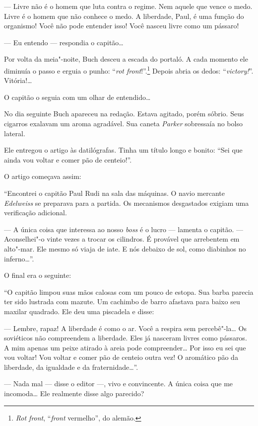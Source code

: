 --- Livre não é o homem que luta contra o regime. Nem aquele que vence o
medo. Livre é o homem que não conhece o medo. A liberdade, Paul, é uma
função do organismo! Você não pode entender isso! Você nasceu livre como
um pássaro!

--- Eu entendo --- respondia o capitão\ldots{}

Por volta da meia"-noite, Buch desceu a escada do portaló. A cada momento
ele diminuía o passo e erguia o punho: ``\emph{rot front}!''.\footnote{\emph{Rot
  front}, ``\emph{front} vermelho'', do alemão.} Depois abria os
dedos: ``\emph{victory!}''. Vitória!\ldots{}

O capitão o seguia com um olhar de entendido\ldots{}

No dia seguinte Buch apareceu na redação. Estava agitado, porém sóbrio.
Seus cigarros exalavam um aroma agradável. Sua caneta \emph{Parker}
sobressaía no bolso lateral.

Ele entregou o artigo às datilógrafas. Tinha um título longo e bonito:
``Sei que ainda vou voltar e comer pão de centeio!''.

O artigo começava assim:

``Encontrei o capitão Paul Rudi na sala das máquinas. O navio mercante
\emph{Edelweiss} se preparava para a partida. Os mecanismos desgastados
exigiam uma verificação adicional.

--- A única coisa que interessa ao nosso \emph{boss} é o lucro ---
lamenta o capitão. --- Aconselhei"-o vinte vezes a trocar os cilindros. É
provável que arrebentem em alto"-mar. Ele mesmo só viaja de iate. E nós
debaixo de sol, como diabinhos no inferno\ldots{}''.

O final era o seguinte:

``O capitão limpou suas mãos calosas com um pouco de estopa. Sua barba
parecia ter sido lustrada com mazute. Um cachimbo de barro afastava para baixo seu
maxilar quadrado. Ele deu uma piscadela e disse:

--- Lembre, rapaz! A liberdade é como o ar. Você a respira sem
percebê"-la\ldots{} Os soviéticos não compreendem a liberdade. Eles já
nasceram livres como pássaros. A mim apenas um peixe atirado à areia
pode compreender\ldots{} Por isso eu sei que vou voltar! Vou voltar e comer
pão de centeio outra vez! O aromático pão da liberdade, da igualdade e
da fraternidade\ldots{}''.

--- Nada mal --- disse o editor ---, vivo e convincente. A única coisa
que me incomoda\ldots{} Ele realmente disse algo parecido?

